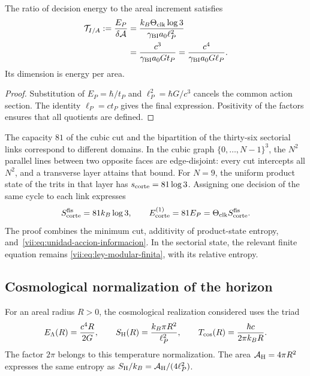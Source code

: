 \begin{proposition}
\label{vii:prop:tension-informacion-area}
The ratio of decision energy to the areal increment satisfies
\begin{equation}
 \begin{aligned}
 \mathcal T_{I/A}:=\frac{E_P}{\delta\mathcal A}
 &=\frac{k_B\Theta_{\rm clk}\log3}{\gamma_{\rm BI}a_0\ell_P^2}\\
 &=\frac{c^3}{\gamma_{\rm BI}a_0G t_P}
  =\frac{c^4}{\gamma_{\rm BI}a_0G\ell_P}.
 \end{aligned}
 \label{vii:eq:tension-informacion-area}
\end{equation}
Its dimension is energy per area.
\end{proposition}
\begin{proof}
Substitution of \(E_P=\hbar/t_P\) and
\(\ell_P^2=\hbar G/c^3\) cancels the common action section.
The identity \(\ell_P=ct_P\) gives the final expression. Positivity
of the factors ensures that all quotients are defined.
\end{proof}

The capacity \(81\) of the cubic cut and the bipartition of the thirty-six
sectorial links correspond to different domains. In the cubic graph
\(\{0,\ldots,N-1\}^3\), the \(N^2\) parallel lines
between two opposite faces are edge-disjoint: every cut
intercepts all \(N^2\), and a transverse layer attains that bound.
For \(N=9\), the uniform product state of the trits in that layer
has \(s_{\rm corte}=81\log3\). Assigning one decision of the
same cycle to each link expresses
\begin{equation}
 S_{\rm corte}^{\rm fis}=81k_B\log3,\qquad
 E_{\rm corte}^{(1)}=81E_P
                  =\Theta_{\rm clk}S_{\rm corte}^{\rm fis}.
 \label{vii:eq:corte-energia-informacion}
\end{equation}
The proof combines the minimum cut, additivity of product-state
entropy, and~\eqref{vii:eq:unidad-accion-informacion}. In the sectorial
state, the relevant finite equation remains
\eqref{vii:eq:ley-modular-finita}, with its relative entropy.

\subsection{Cosmological normalization of the horizon}
\label{vii:subsec:balance-horizonte}

For an areal radius \(R>0\), the cosmological realization considered
uses the triad
\begin{equation}
 E_\Lambda(R)=\frac{c^4R}{2G},\qquad
 S_{\rm H}(R)=\frac{k_B\pi R^2}{\ell_P^2},\qquad
 T_{\rm cos}(R)=\frac{\hbar c}{2\pi k_BR}.
 \label{vii:eq:horizonte-cosmologico}
\end{equation}
The factor \(2\pi\) belongs to this temperature normalization.
The area \(\mathcal A_{\rm H}=4\pi R^2\) expresses the same entropy
as \(S_{\rm H}/k_B=\mathcal A_{\rm H}/(4\ell_P^2)\).

